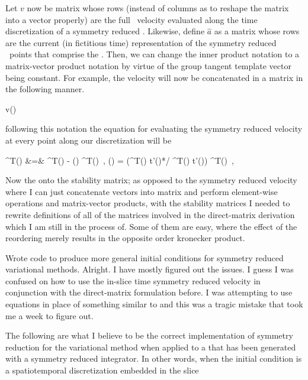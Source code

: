 Let $v$ now be matrix whose rows (instead of columns as to reshape the matrix into a vector properly)
are the full \statesp\ velocity evaluated along the time discretization of a symmetry reduced
\rpo. Likewise, define $\hat{a}$ as a matrix whose rows are the current (in fictitious time) representation of the symmetry
reduced \statesp\ points that comprise the \rpo. Then, we can change the inner product notation to a matrix-vector product notation
by virtue of the group tangent template vector being constant. For example, the velocity will now be concatenated in a matrix
in the following manner.

\beq
v() \rightarrow {} 
\eeq

following this notation the equation for evaluating the symmetry reduced velocity at every point along our discretization
will be

\bea \nonumber
    ^T() &=&
                ^T() - \dot{\theta}() ^T() \,, \quad
    \dot{\mathbf{\theta}}() =
                (^T() \cdot t'()*/ ^T() \cdot t'()) ^T()  \,, \quad
\eea

Now the onto the stability matrix; as opposed to the symmetry reduced velocity where
I can just concatenate vectors into matrix and perform element-wise operations and matrix-vector products, with the stability
matrices I needed to rewrite definitions of all of the matrices involved in the direct-matrix derivation which I am
still in the process of. Some of them are easy, where the effect of the reordering merely results in the opposite order
kronecker product.

Wrote code to produce more general initial conditions for symmetry reduced variational methods.
Alright. I have mostly figured out the issues. I guess I was confused on how to use the in-slice time symmetry reduced
velocity in conjunction with the direct-matrix formulation before. I was attempting to use equations 
in place
of something similar to  and this was a tragic mistake that took me a week to figure out.

The following are what I believe to be the correct implementation of symmetry reduction for the variational
method when applied to a {\rpo} that has been generated with a symmetry reduced integrator. In other words,
when the initial condition is a spatiotemporal discretization embedded in the slice

